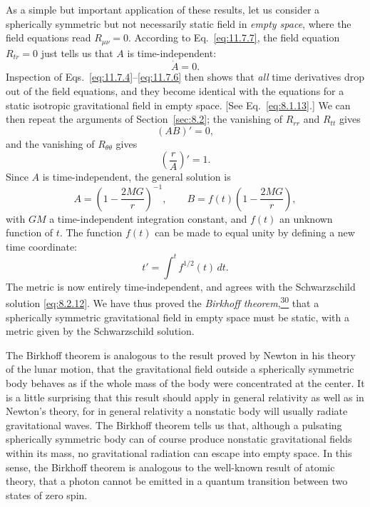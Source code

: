 As a simple but important application of these results, let us consider a
spherically symmetric but not necessarily static field in \emph{empty space},
where the field equations read \(R_{\mu\nu}=0\). According to
Eq.~\eqref{eq:11.7.7}, the field equation \(R_{tr}=0\) just tells us that
\(A\) is time-independent:
\[
  \dot A=0.
\]
Inspection of Eqs.~\eqref{eq:11.7.4}--\eqref{eq:11.7.6} then shows that
\emph{all} time derivatives drop out of the field equations, and they become
identical with the equations for a static isotropic gravitational field in
empty space. [See Eq.~\eqref{eq:8.1.13}.] We can then repeat the arguments
of Section~\ref{sec:8.2}; the vanishing of \(R_{rr}\) and \(R_{tt}\) gives
\[
  (AB)'=0,
\]
and the vanishing of \(R_{\theta\theta}\) gives
\[
  \left(\frac rA\right)'=1.
\]
Since \(A\) is time-independent, the general solution is
\[
  A=\left(1-\frac{2MG}{r}\right)^{-1},
  \qquad
  B=f(t)\left(1-\frac{2MG}{r}\right),
\]
with \(GM\) a time-independent integration constant, and \(f(t)\) an unknown
function of \(t\). The function \(f(t)\) can be made to equal unity by
defining a new time coordinate:
\[
  t'=\int^t f^{1/2}(t)\,dt.
\]
The metric is now entirely time-independent, and agrees with the Schwarzschild
solution \eqref{eq:8.2.12}. We have thus proved the \emph{Birkhoff
theorem},\hyperref[ch11-ref-30]{\textsuperscript{30}} that a spherically
symmetric gravitational field in empty space must be static, with a metric
given by the Schwarzschild solution.

The Birkhoff theorem is analogous to the result proved by Newton in his theory
of the lunar motion, that the gravitational field outside a spherically
symmetric body behaves as if the whole mass of the body were concentrated at
the center. It is a little surprising that this result should apply in general
relativity as well as in Newton's theory, for in general relativity a nonstatic
body will usually radiate gravitational waves. The Birkhoff theorem tells us
that, although a pulsating spherically symmetric body can of course produce
nonstatic gravitational fields within its mass, no gravitational radiation
can escape into empty space. In this sense, the Birkhoff theorem is analogous
to the well-known result of atomic theory, that a photon cannot be emitted in
a quantum transition between two states of zero spin.

